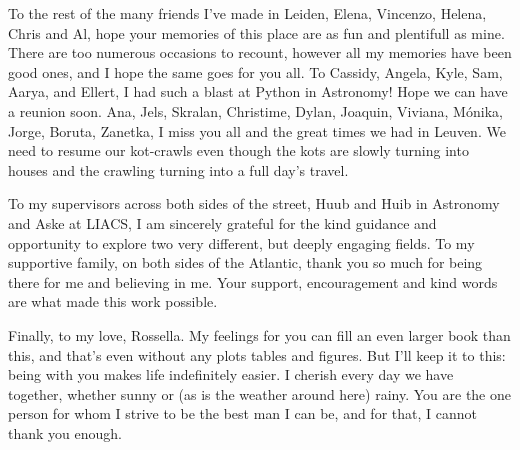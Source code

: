 \begin{thesisacknowledgements}
    To the rest of the many friends I've made in Leiden, Elena, Vincenzo, Helena, Chris and Al, hope your memories of this place are as fun and plentifull as mine. There are too numerous occasions to recount, however all my memories have been good ones, and I hope the same goes for you all. To Cassidy, Angela, Kyle, Sam, Aarya, and Ellert, I had such a blast at Python in Astronomy! Hope we can have a reunion soon. Ana, Jels, Skralan, Christime, Dylan, Joaquin, Viviana, M{\'o}nika, Jorge, Boruta, Zanetka, I miss you all and the great times we had in Leuven. We need to resume our kot-crawls even though the kots are slowly turning into houses and the crawling turning into a full day's travel. 

    To my supervisors across both sides of the street, Huub and Huib in Astronomy and Aske at LIACS, I am sincerely grateful for the kind guidance and opportunity to explore two very different, but deeply engaging fields. To my supportive family, on both sides of the Atlantic, thank you so much for being there for me and believing in me. Your support, encouragement and kind words are what made this work possible. 

    Finally, to my love, Rossella. My feelings for you can fill an even larger book than this, and that's even without any plots tables and figures. But I'll keep it to this: being with you makes life indefinitely easier. I cherish every day we have together, whether sunny or (as is the weather around here) rainy. You are the one person for whom I strive to be the best man I can be, and for that, I cannot thank you enough.  

\end{thesisacknowledgements}

